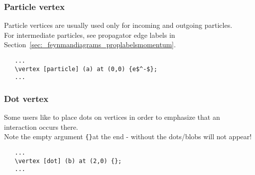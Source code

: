 \documentclass[10pt,letterpaper,twoside,notitlepage]{article}
\numberwithin{figure}{section}
\begin{document}
\subsubsection*{Particle vertex}
%
\noindent
Particle vertices are usually used only for incoming 
and outgoing particles. \\
For intermediate particles, see propagator edge labels in 
Section~\ref{sec:_feynmandiagrams_proplabelsmomentum}.
\vspace{2mm}\\
%
\begin{minipage}{0.7\linewidth}
\vercol\begin{verbatim}
   ...
   \vertex [particle] (a) at (0,0) {e$^-$};
   ...
\end{verbatim}\txcol
\end{minipage}
%
\begin{minipage}{0.25\linewidth}
\end{minipage}
%
\subsubsection*{Dot vertex}
%
\noindent
Some users like to place dots on vertices in order to emphasize
that an interaction occurs there.\\
Note the empty argument \redcol\verb${}$\txcol at the end -
without the dots/blobs will not appear!
\vspace{2mm}\\
%
\begin{minipage}{0.7\linewidth}
\vercol\begin{verbatim}
   ...
   \vertex [dot] (b) at (2,0) {};
   ...
\end{verbatim}\txcol
\end{minipage}
%
\begin{minipage}{0.25\linewidth}
\end{minipage}
%
\end{document}
